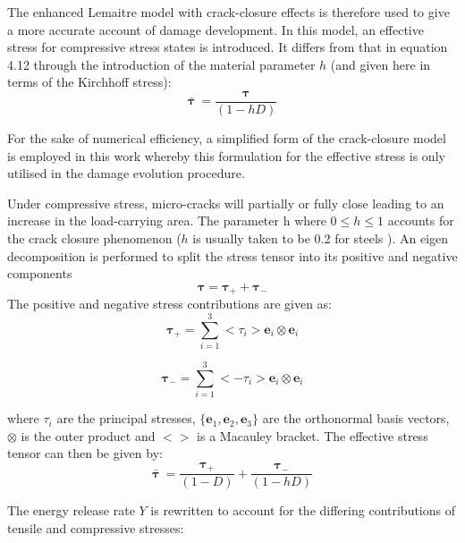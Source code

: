 \documentclass[sn-mathphys,Numbered,draft]{sn-jnl}%
\begin{document}
The enhanced Lemaitre model with crack-closure effects \cite{pires_issues_2005,teixeira_ductile_2010} is therefore used to give a more accurate account of damage development. In this model, an effective stress for compressive stress states is introduced. It differs from that in equation 4.12 through the introduction of the material parameter $h$ (and given here in terms of the Kirchhoff stress):
\begin{equation}
	\bar{\boldsymbol{\tau}}\ =\frac{\boldsymbol{\tau}}{\left(1-hD\right)}	
\end{equation}

For the sake of numerical efficiency, a simplified form of the crack-closure model \cite{teixeira_ductile_2010} is employed in this work whereby this formulation for the effective stress is only utilised in the damage evolution procedure. 

Under compressive stress, micro-cracks will partially or fully close leading to an increase in the load-carrying area. The parameter h where $0\le h\le1$ accounts for the crack closure phenomenon ($h$ is usually taken to be 0.2 for steels \cite{desmorat_modeling_2008,lemaitre_course_1996,bouchard_enhanced_2011}). 
An eigen decomposition is performed to split the stress tensor into its positive and negative components
\begin{equation}
	\boldsymbol{\tau}=\boldsymbol{\tau}_++\boldsymbol{\tau}_-	
\end{equation}
The positive and negative stress contributions are given as:
\begin{equation}
	\boldsymbol{\tau}_+=\sum_{i=1}^{3}<{\tau}_i>\mathbf{e}_i\otimes\mathbf{e}_i	
\end{equation}

\begin{equation}
	\boldsymbol{\tau}_-=\sum_{i=1}^{3}<{-{\tau}}_i>\mathbf{e}_i\otimes\mathbf{e}_i
\end{equation}

where ${\tau}_i$ are the principal stresses, $\{\mathbf{e}_1,\mathbf{e}_2,\mathbf{e}_3\}$ are the orthonormal basis vectors, $\otimes$ is the outer product and $<>$ is a Macauley bracket.
The effective stress tensor can then be given by:
\begin{equation}
	\bar{\boldsymbol{\tau}}\ =\frac{\boldsymbol{\tau}_+}{\left(1-D\right)}+\frac{\boldsymbol{\tau}_-}{\left(1-hD\right)}	
\end{equation}

The energy release rate $Y$ is rewritten to account for the differing contributions of tensile and compressive stresses:
\end{document}
